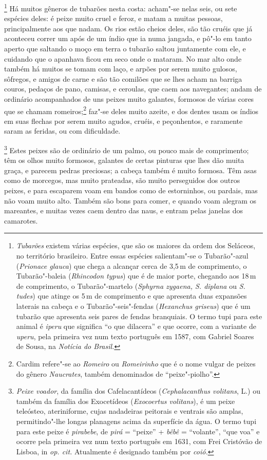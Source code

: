 \footnote{ \textit{Tubarões} existem várias
espécies, que são os maiores da ordem dos Seláceos, no território
brasileiro. Entre essas espécies salientam"-se o Tubarão"-azul
(\textit{Prionace glauca}) que chega a alcançar cerca de 3,5\,m de
comprimento, o Tubarão"-baleia (\textit{Rhincodon typus}) que é de
maior porte, chegando aos 18\,m de comprimento, o Tubarão"-martelo
(\textit{Sphyrna zygaena, S. diplana} ou \textit{S. tudes}) que
atinge os 5\,m de comprimento e que apresenta duas expansões laterais
na cabeça e o Tubarão"-seis"-fendas (\textit{Hexanchus griseus}) que é
um tubarão que apresenta seis pares de fendas branquiais. O termo tupi
para este animal é \textit{iperu} que significa ``o que dilacera'' e
que ocorre, com a variante de \textit{uperu}, pela primeira vez num
texto português em 1587, com Gabriel Soares de Sousa, na
\textit{Notícia do Brasil.}} Há muitos gêneros de tubarões
nesta costa: acham"-se nelas seis, ou sete espécies deles: é peixe muito
cruel e feroz, e matam a muitas pessoas, principalmente aos que nadam.
Os rios estão cheios deles, são tão cruéis que já aconteceu correr um
após de um índio que ia numa jangada, e pô"-lo em tanto aperto que
saltando o moço em terra o tubarão saltou juntamente com ele, e
cuidando que o apanhava ficou em seco onde o mataram. No mar alto onde
também há muitos se tomam com laço, e arpões por serem muito gulosos,
sôfregos, e amigos de carne e são tão comilões que se lhes acham na
barriga couros, pedaços de pano, camisas, e ceroulas, que caem aos
navegantes; andam de ordinário acompanhados de uns peixes muito
galantes, formosos de várias cores que se chamam romeiros;\footnote{ Cardim 
refere"-se ao \textit{Romeiro} ou \textit{Romeirinho} que é o
nome vulgar de peixes do gênero \textit{Naucrates}, também denominados
de ``peixe"-piolho''.} faz"-se deles muito azeite, e dos dentes usam os
índios em suas flechas por serem muito agudos, cruéis, e peçonhentos, e
raramente saram as feridas, ou com dificuldade.

\footnote{ \textit{Peixe voador}, da família dos
Cafelacantídeos (\textit{Cephalacanthus volitans}, L.) ou também da
família dos Exocetídeos (\textit{Exocoertus volitans}), é um peixe
teleósteo, ateriniforme, cujas nadadeiras peitorais e ventrais são
amplas, permitindo"-lhe longas planagens acima da superfície da água. O
termo tupi para este peixe é \textit{pirabebe}, de \textit{pirá} = 
``peixe'' + \textit{bêbê} = ``volante'', ``que voa'' e ocorre pela primeira
vez num texto português em 1631, com Frei Cristóvão de Lisboa, in
\textit{op. cit.} Atualmente é designado também por
\textit{coió.}} Estes peixes são de ordinário de um palmo,
ou pouco mais de comprimento; têm os olhos muito formosos, galantes de
certas pinturas que lhes dão muita graça, e parecem pedras preciosas; a
cabeça também é muito formosa. Têm asas como de morcegos, mas muito
prateadas, são muito perseguidos dos outros peixes, e para escaparem
voam em bandos como de estorninhos, ou pardais, mas não voam muito
alto. Também são bons para comer, e quando voam alegram os mareantes, e
muitas vezes caem dentro das naus, e entram pelas janelas dos
camarotes.

